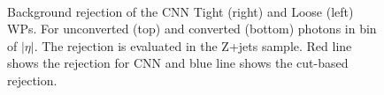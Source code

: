 \begin{figure}[htbp]
    \centering
	 \\
    \caption{Background rejection of the CNN Tight (right) and Loose (left) WPs. For unconverted (top) and converted (bottom) photons in bin of $|\eta|$. The rejection is evaluated in the Z+jets sample. Red line shows the rejection for CNN and blue line shows the cut-based rejection.}
    \label{BkgRej}
\end{figure}

